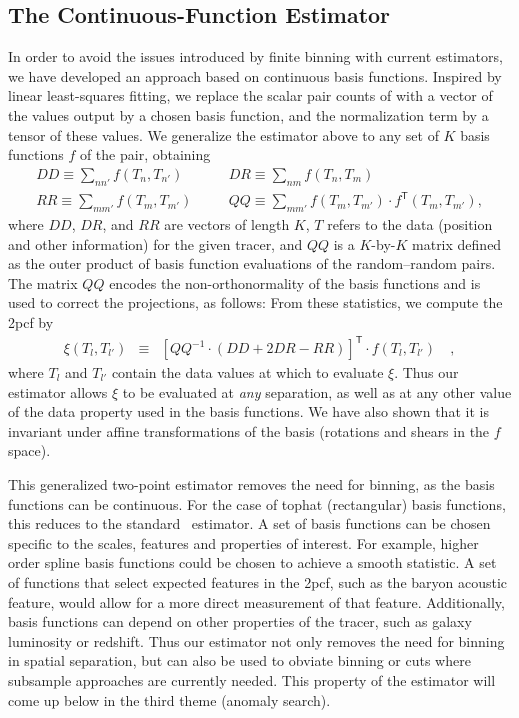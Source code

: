 \documentclass[12pt, fullpage, letterpaper]{article}
\newcommand{\cf}{2pcf\xspace}
\newcommand{\LS}{\acronym{LS}\xspace}
\newcommand{\inv}{^{-1}}
\newcommand{\T}{^{\mathsf{T}}}
\begin{document}
\subsection{The Continuous-Function Estimator}

In order to avoid the issues introduced by finite binning with current estimators, we have developed an approach based on continuous basis functions. 
Inspired by linear least-squares fitting, we replace the scalar pair counts of \LS with a vector of the values output by a chosen basis function, and the normalization term by a tensor of these values.
We generalize the \LS estimator above to any set of $K$ basis functions $f$ of the pair, obtaining
\begin{eqnarray}\displaystyle
DD \equiv \sum_{n n'} f(T_n, T_{n'}) &\quad&
DR \equiv \sum_{n m} f(T_n, T_{m}) \nonumber\\
RR \equiv \sum_{m m'} f(T_m, T_{m'}) &\quad&
QQ \equiv \sum_{m m'} f(T_m, T_{m'}) \cdot f\T(T_m, T_{m'}),
\end{eqnarray}
where $DD$, $DR$, and $RR$ are vectors of length $K$, $T$ refers to the data (position and other information) for the given tracer, and $QQ$ is a $K$-by-$K$ matrix defined as the outer product of basis function evaluations of the random--random pairs.
The matrix $QQ$ encodes the non-orthonormality of the basis functions and is used to correct the projections, as follows:
From these statistics, we compute the \cf by
\begin{eqnarray}\displaystyle
\xi(T_l, T_{l'}) &\equiv& [QQ\inv \cdot (DD + 2DR - RR)]\T \cdot f(T_l, T_{l'}) \quad ,
\end{eqnarray}
where $T_l$ and $T_{l'}$ contain the data values at which to evaluate $\xi$.
Thus our estimator allows $\xi$ to be evaluated at \emph{any} separation, as well as at any other value of the data property used in the basis functions.
We have also shown that it is invariant under affine transformations of the basis (rotations and shears in the $f$ space).

This generalized two-point estimator removes the need for binning, as the basis functions can be continuous.
For the case of tophat (rectangular) basis functions, this reduces to the standard \LS\ estimator.
A set of basis functions can be chosen specific to the scales, features and properties of interest.
For example, higher order spline basis functions could be chosen to achieve a smooth statistic. 
A set of functions that select expected features in the \cf, such as the baryon acoustic feature, would allow for a more direct measurement of that feature.
Additionally, basis functions can depend on other properties of the tracer, such as galaxy luminosity or redshift.
Thus our estimator not only removes the need for binning in spatial separation, but can also be used to obviate binning or cuts where subsample approaches are currently needed.
This property of the estimator will come up below in the third theme (anomaly search).
\end{document}
